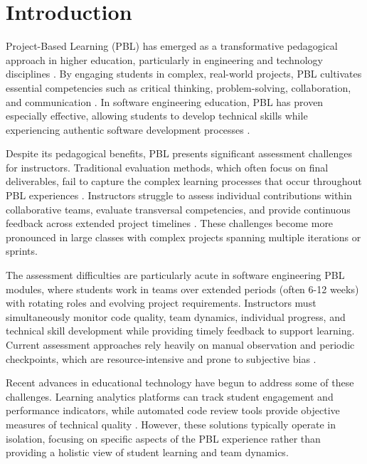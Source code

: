 \documentclass[review]{elsarticle}
\begin{document}
\linenumbers

\section{Introduction}
\label{sec:introduction}

Project-Based Learning (PBL) has emerged as a transformative pedagogical approach in higher education, particularly in engineering and technology disciplines \cite{thornton2022}. By engaging students in complex, real-world projects, PBL cultivates essential competencies such as critical thinking, problem-solving, collaboration, and communication \cite{bell2010}. In software engineering education, PBL has proven especially effective, allowing students to develop technical skills while experiencing authentic software development processes \cite{krumholz2021}.

Despite its pedagogical benefits, PBL presents significant assessment challenges for instructors. Traditional evaluation methods, which often focus on final deliverables, fail to capture the complex learning processes that occur throughout PBL experiences \cite{wengrowicz2017}. Instructors struggle to assess individual contributions within collaborative teams, evaluate transversal competencies, and provide continuous feedback across extended project timelines \cite{sheppard2023}. These challenges become more pronounced in large classes with complex projects spanning multiple iterations or sprints.

The assessment difficulties are particularly acute in software engineering PBL modules, where students work in teams over extended periods (often 6-12 weeks) with rotating roles and evolving project requirements. Instructors must simultaneously monitor code quality, team dynamics, individual progress, and technical skill development while providing timely feedback to support learning. Current assessment approaches rely heavily on manual observation and periodic checkpoints, which are resource-intensive and prone to subjective bias \cite{stegeman2018}.

Recent advances in educational technology have begun to address some of these challenges. Learning analytics platforms can track student engagement and performance indicators, while automated code review tools provide objective measures of technical quality \cite{mitchell2020}. However, these solutions typically operate in isolation, focusing on specific aspects of the PBL experience rather than providing a holistic view of student learning and team dynamics.
\end{document}
